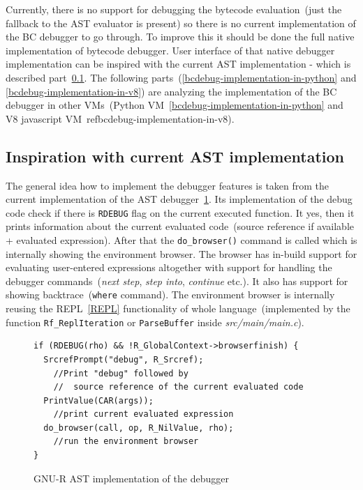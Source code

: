 \documentclass[thesis=M,english]{FITthesis}[2018/10/20]
\newcommand{\code}[1]{\texttt{#1}}
\begin{document}
Currently, there is no support for debugging the bytecode evaluation~(just the fallback to the AST evaluator is present) so there is no current implementation of the BC debugger to go through. To improve this it should be done the full native implementation of bytecode debugger. User interface of that native debugger implementation can be inspired with the current AST implementation - which is described part~\ref{inspiration-with-current-implementation}. The following parts~(\ref{bcdebug-implementation-in-python} and \ref{bcdebug-implementation-in-v8}) are analyzing the implementation of the BC debugger in other VMs~(Python VM~\ref{bcdebug-implementation-in-python} and V8 javascript VM~ref{bcdebug-implementation-in-v8}).

\subsection{Inspiration with current AST implementation}\label{inspiration-with-current-implementation}

The general idea how to implement the debugger features is taken from the current implementation of the AST debugger~\ref{fig:ast-implementation-of-debugger}. Its implementation of the debug code check if there is \code{RDEBUG} flag on the current executed function. It yes, then it prints information about the current evaluated code~(source reference if available + evaluated expression). After that the \code{do{\_}browser()} command is called which is internally showing the environment browser. The browser has in-build support for evaluating user-entered expressions altogether with support for handling the debugger commands~(\textit{next step}, \textit{step into}, \textit{continue} etc.). It also has support for showing backtrace~(\code{where} command). The environment browser is internally reusing the REPL~\ref{REPL} functionality of whole language~(implemented by the function \code{Rf{\_}ReplIteration} or \code{ParseBuffer} inside \textit{src/main/main.c}).

\begin{figure}[H]
\begin{lstlisting}
if (RDEBUG(rho) && !R_GlobalContext->browserfinish) {
  SrcrefPrompt("debug", R_Srcref);
    //Print "debug" followed by
    //  source reference of the current evaluated code
  PrintValue(CAR(args));
  	//print current evaluated expression
  do_browser(call, op, R_NilValue, rho);
  	//run the environment browser
}
\end{lstlisting}
	\caption{GNU-R AST implementation of the debugger}\label{fig:ast-implementation-of-debugger}
\end{figure}
\end{document}
